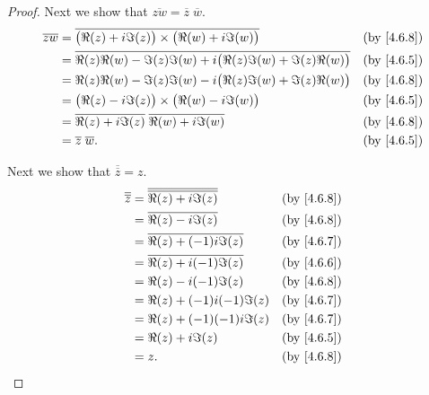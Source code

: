 \begin{proof}
  Next we show that \(\overline{zw} = \overline{z} \; \overline{w}\).
  \begin{align*}
    \overline{zw} & = \overline{\big(\Re(z) + i \Im(z)\big) \times \big(\Re(w) + i \Im(w)\big)}            & \text{(by \cref{4.6.8})} \\
                  & = \overline{\Re(z) \Re(w) - \Im(z) \Im(w) + i \big(\Re(z) \Im(w) + \Im(z) \Re(w)\big)} & \text{(by \cref{4.6.5})} \\
                  & = \Re(z) \Re(w) - \Im(z) \Im(w) - i \big(\Re(z) \Im(w) + \Im(z) \Re(w)\big)            & \text{(by \cref{4.6.8})} \\
                  & = \big(\Re(z) - i \Im(z)\big) \times \big(\Re(w) - i \Im(w)\big)                       & \text{(by \cref{4.6.5})} \\
                  & = \overline{\Re(z) + i \Im(z)} \; \overline{\Re(w) + i \Im(w)}                         & \text{(by \cref{4.6.8})} \\
                  & = \overline{z} \; \overline{w}.                                                        & \text{(by \cref{4.6.5})}
  \end{align*}

  Next we show that \(\overline{\overline{z}} = z\).
  \begin{align*}
    \overline{\overline{z}} & = \overline{\overline{\Re(z) + i \Im(z)}} & \text{(by \cref{4.6.8})} \\
                            & = \overline{\Re(z) - i \Im(z)}            & \text{(by \cref{4.6.8})} \\
                            & = \overline{\Re(z) + (-1) i \Im(z)}       & \text{(by \cref{4.6.7})} \\
                            & = \overline{\Re(z) + i (-1) \Im(z)}       & \text{(by \cref{4.6.6})} \\
                            & = \Re(z) - i (-1) \Im(z)                  & \text{(by \cref{4.6.8})} \\
                            & = \Re(z) + (-1) i (-1) \Im(z)             & \text{(by \cref{4.6.7})} \\
                            & = \Re(z) + (-1) (-1) i \Im(z)             & \text{(by \cref{4.6.7})} \\
                            & = \Re(z) + i \Im(z)                       & \text{(by \cref{4.6.5})} \\
                            & = z.                                      & \text{(by \cref{4.6.8})}
  \end{align*}


\end{proof}
